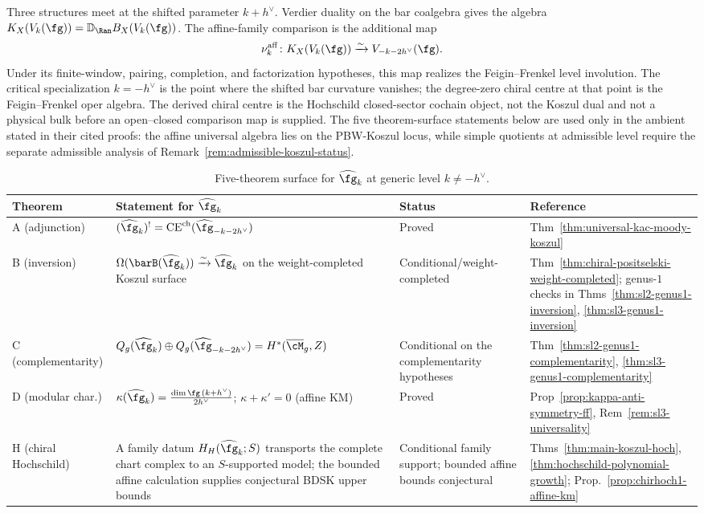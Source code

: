 Three structures meet at the shifted parameter $k+h^\vee$.  Verdier
duality on the bar coalgebra gives the algebra
$K_X(V_k(\fg))=\mathbb D_{\Ran}B_X(V_k(\fg))$.  The affine-family
comparison is the additional map
\[
 \nu_k^{\mathrm{aff}}\colon
 K_X(V_k(\fg))\xrightarrow{\sim}V_{-k-2h^\vee}(\fg).
\]
Under its finite-window, pairing, completion, and factorization
hypotheses, this map realizes the Feigin--Frenkel level involution.
The critical specialization
$k=-h^\vee$ is the point where the shifted bar curvature vanishes; the
degree-zero chiral centre at that point is the Feigin--Frenkel oper
algebra.  The derived chiral centre is the Hochschild closed-sector
cochain object, not the Koszul dual and not a physical bulk before an
open--closed comparison map is supplied.  The five theorem-surface statements below
are used only in the ambient stated in their cited proofs: the affine
universal algebra lies on the PBW-Koszul locus, while simple quotients
at admissible level require the separate admissible analysis of
Remark~\ref{rem:admissible-koszul-status}.

\begin{table}[ht]
\centering
\small
\caption{Five-theorem surface for
$\widehat{\fg}_k$ at generic level
$k \neq -h^\vee$.}\label{tab:km-five-theorems}
\begin{tabular}{llll}
\toprule
\textbf{Theorem} & \textbf{Statement for $\widehat{\fg}_k$}
 & \textbf{Status} & \textbf{Reference} \\
\midrule
A (adjunction) &
 $(\widehat{\fg}_k)^! = \mathrm{CE}^{\mathrm{ch}}(\widehat{\fg}_{-k-2h^\vee})$
 & Proved & Thm~\ref{thm:universal-kac-moody-koszul} \\
B (inversion) &
 $\Omega(\barB(\widehat{\fg}_k)) \xrightarrow{\sim}
 \widehat{\fg}_k$ on the weight-completed Koszul surface
 & Conditional/weight-completed &
 Thm~\ref{thm:chiral-positselski-weight-completed};
 genus-$1$ checks in Thms~\ref{thm:sl2-genus1-inversion},
 \ref{thm:sl3-genus1-inversion} \\
C (complementarity) &
 $Q_g(\widehat{\fg}_k) \oplus
 Q_g(\widehat{\fg}_{-k-2h^\vee})
 = H^*(\overline{\cM}_g, Z)$
 & Conditional on the complementarity hypotheses &
 Thm~\ref{thm:sl2-genus1-complementarity},
 \ref{thm:sl3-genus1-complementarity} \\
D (modular char.) &
 $\kappa(\widehat{\fg}_k)
 = \frac{\dim\fg\,(k{+}h^\vee)}{2h^\vee}$;\quad
 $\kappa + \kappa' = 0$ (affine KM)
 & Proved & Prop~\ref{prop:kappa-anti-symmetry-ff},
 Rem~\ref{rem:sl3-universality} \\
H (chiral Hochschild) &
 A family datum $H_H(\widehat{\fg}_k;S)$ transports the complete
 chart complex to an $S$-supported model; the bounded affine
 calculation supplies conjectural BDSK upper bounds
 & Conditional family support; bounded affine bounds conjectural &
 Thms~\ref{thm:main-koszul-hoch},
 \ref{thm:hochschild-polynomial-growth};
 Prop.~\ref{prop:chirhoch1-affine-km} \\
\bottomrule
\end{tabular}
\end{table}

